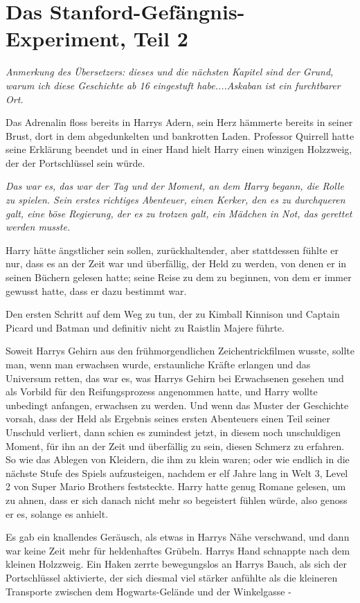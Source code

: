 \chapter{Das Stanford-Gefängnis-Experiment, Teil 2}

\emph{Anmerkung des Übersetzers: dieses und die nächsten Kapitel sind der Grund, warum ich diese Geschichte ab 16 eingestuft habe....Askaban ist ein furchtbarer Ort.}

Das Adrenalin floss bereits in Harrys Adern, sein Herz hämmerte bereits in
seiner Brust, dort in dem abgedunkelten und bankrotten Laden. Professor Quirrell
hatte seine Erklärung beendet und in einer Hand hielt Harry einen winzigen
Holzzweig, der der Portschlüssel sein würde.

\emph{Das war es, das war der Tag und der Moment, an dem Harry begann, die Rolle zu spielen. Sein erstes richtiges Abenteuer, einen Kerker, den es zu durchqueren galt, eine böse Regierung, der es zu trotzen galt, ein Mädchen in Not, das gerettet werden musste.}

Harry hätte ängstlicher sein sollen, zurückhaltender, aber stattdessen fühlte er
nur, dass es an der Zeit war und überfällig, der Held zu werden, von denen er in
seinen Büchern gelesen hatte; seine Reise zu dem zu beginnen, von dem er immer
gewusst hatte, dass er dazu bestimmt war.

Den ersten Schritt auf dem Weg zu tun, der zu Kimball Kinnison und Captain
Picard und Batman und definitiv nicht zu Raistlin Majere führte.

Soweit Harrys Gehirn aus den frühmorgendlichen Zeichentrickfilmen wusste, sollte
man, wenn man erwachsen wurde, erstaunliche Kräfte erlangen und das Universum
retten, das war es, was Harrys Gehirn bei Erwachsenen gesehen und als Vorbild
für den Reifungsprozess angenommen hatte, und Harry wollte unbedingt anfangen,
erwachsen zu werden. Und wenn das Muster der Geschichte vorsah, dass der Held
als Ergebnis seines ersten Abenteuers einen Teil seiner Unschuld verliert, dann
schien es zumindest jetzt, in diesem noch unschuldigen Moment, für ihn an der
Zeit und überfällig zu sein, diesen Schmerz zu erfahren. So wie das Ablegen von
Kleidern, die ihm zu klein waren; oder wie endlich in die nächste Stufe des
Spiels aufzusteigen, nachdem er elf Jahre lang in Welt 3, Level 2 von Super
Mario Brothers feststeckte. Harry hatte genug Romane gelesen, um zu ahnen, dass
er sich danach nicht mehr so begeistert fühlen würde, also genoss er es, solange
es anhielt.

Es gab ein knallendes Geräusch, als etwas in Harrys Nähe verschwand, und dann
war keine Zeit mehr für heldenhaftes Grübeln. Harrys Hand schnappte nach dem
kleinen Holzzweig. Ein Haken zerrte bewegungslos an Harrys Bauch, als sich der
Portschlüssel aktivierte, der sich diesmal viel stärker anfühlte als die
kleineren Transporte zwischen dem Hogwarts-Gelände und der Winkelgasse -

